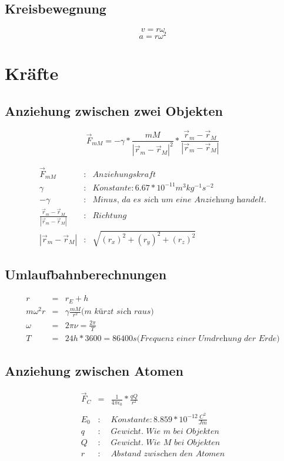 \documentclass[11pt]{article}
\begin{document}
\subsection{Kreisbewegnung}
$$v = r\omega$$
$$a = r\omega^2$$
\section{Kräfte}
\subsection{Anziehung zwischen zwei Objekten}
$$\overrightarrow{F}_{mM} = -\gamma * \frac{mM}{|\overrightarrow{r}_m-\overrightarrow{r}_M|^2} * \frac{\overrightarrow{r}_m-\overrightarrow{r}_M}{|\overrightarrow{r}_m-\overrightarrow{r}_M|} $$

\begin{eqnarray*}
\overrightarrow{F}_{mM} &:& Anziehungskraft\\
\gamma &:& Konstante:6.67*10^{-11} m^3kg^{-1}s^{-2}\\
-\gamma &:& \textit{Minus, da es sich um eine Anziehung handelt.}\\
\frac{\overrightarrow{r}_m-\overrightarrow{r}_M}{|\overrightarrow{r}_m-\overrightarrow{r}_M|}&:&Richtung\\
|\overrightarrow{r}_m-\overrightarrow{r}_M| &:& \sqrt{(r_x)^2 + (r_y)^2 + (r_z)^2}
\end{eqnarray*}
\subsection{Umlaufbahnberechnungen}
\begin{eqnarray*}
r &=& r_E + h\\
m\omega^2r &=& \gamma\frac{mM}{r^2} \textit{(m kürzt sich raus)}\\
\omega &=& 2\pi\nu = \frac{2\pi}{T}\\
T &=& 24h * 3600 = 86400s \textit{(Frequenz einer Umdrehung der Erde)}
\end{eqnarray*}
\subsection{Anziehung zwischen Atomen}
\begin{eqnarray*}
\overrightarrow{F}_C&=&\frac{1}{4\pi\epsilon_0}*\frac{qQ}{r^2} \\
\\
E_0 &:& Konstante: 8.859*10^{-12} \frac{C^2}{Jm}\\
q &:& \textit{Gewicht. Wie m bei Objekten}\\
Q &:& \textit{Gewicht. Wie M bei Objekten}\\
r &:& \textit{Abstand zwischen den Atomen}\\
\end{eqnarray*}
\end{document}
